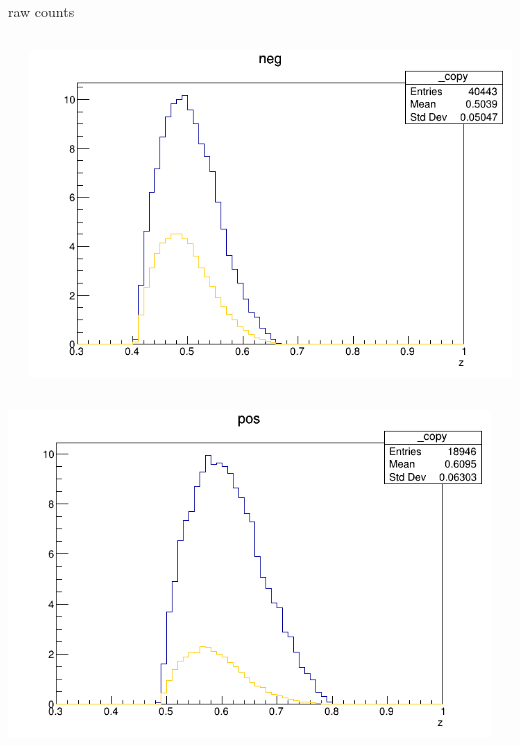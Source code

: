 \begin{frame}{raw counts}
\begin{columns}
\begin{column}[T]{0.25\textwidth}
\end{column}
\begin{column}[T]{0.25\textwidth}
\includegraphics[width = \textwidth]{results/yield/statistics/yield_x_Q2_z_0.55_4.764_0.50_neg.png}
\end{column}
\end{columns}
\begin{columns}
\begin{column}[T]{0.25\textwidth}
\includegraphics[width = \textwidth]{results/yield/statistics/yield_x_Q2_z_0.55_4.764_0.60_pos.png}
\end{column}
\begin{column}[T]{0.25\textwidth}

\end{column}
\end{columns}
\end{frame}
